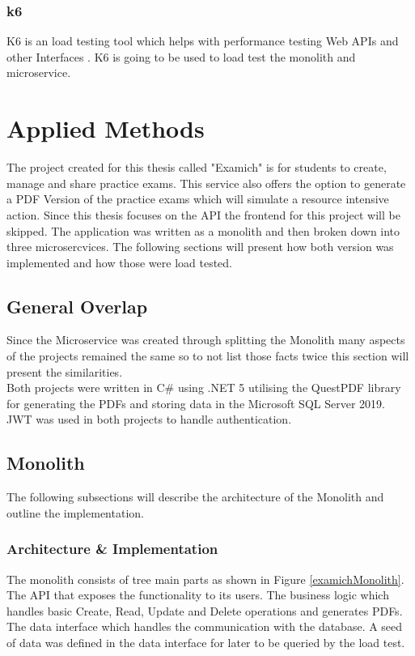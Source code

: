 \documentclass[BIF,Bachelor,nenglish]{twbook}%
\begin{document}
\subsection{k6}
K6 is an load testing tool which helps with performance testing Web \ac{API}s and other Interfaces \cite{k6doc}. K6 is going to be used to load test the monolith and microservice.

\clearpage
\chapter{Applied Methods}
The project created for this thesis called "Examich" is for students to create, manage and share practice exams. This service also offers the option to generate a PDF Version of the practice exams which will simulate a resource intensive action. Since this thesis focuses on the \ac{API} the frontend for this project will be skipped. The application was written as a monolith and then broken down into three microsercvices. The following sections will present how both version was implemented and how those were load tested.

\section{General Overlap}
Since the Microservice was created through splitting the Monolith many aspects of the projects remained the same so to not list those facts twice this section will present the similarities.
\\
\noindent
Both projects were written in C\# using .NET 5 utilising the QuestPDF library for generating the PDFs and storing data in the Microsoft SQL Server 2019. \ac{JWT} was used in both projects to handle authentication.

\section{Monolith}
The following subsections will describe the architecture of the Monolith and outline the implementation.

\subsection{Architecture \& Implementation}
The monolith consists of tree main parts as shown in Figure \ref{examichMonolith}. The \ac{API} that exposes the functionality to its users. The business logic which handles basic Create, Read, Update and Delete operations and generates PDFs. The data interface which handles the communication with the database. A seed of data was defined in the data interface for later to be queried by the load test.
\end{document}
